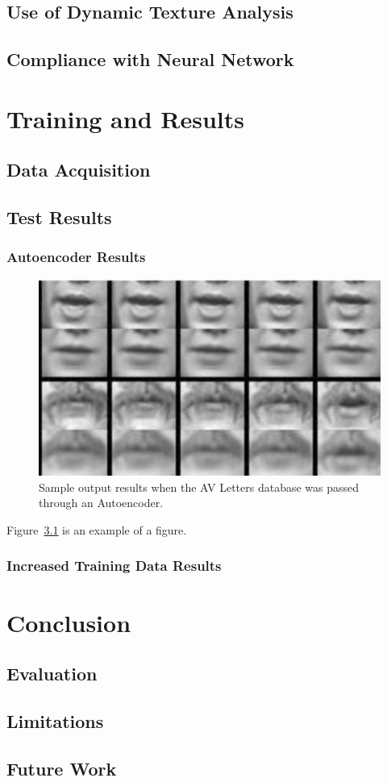 \documentclass[12pt,twoside]{report}
\begin{document}
	\section{Use of Dynamic Texture Analysis}
	\section{Compliance with Neural Network}



\chapter{Training and Results}
	\section{Data Acquisition}
	\section{Test Results}
		\subsection{Autoencoder Results}


\begin{figure}[tb]
\centering
\includegraphics[width = 0.7\hsize]{./figures/sample_autoencode_results}
\caption{Sample output results when the AV Letters database was passed through an Autoencoder.}
\label{fig:logo}
\end{figure}

Figure~\ref{fig:logo} is an example of a figure. 



		\subsection{Increased Training Data Results}


\chapter{Conclusion}
	\section{Evaluation}
	\section{Limitations}
	\section{Future Work}



\end{document}
